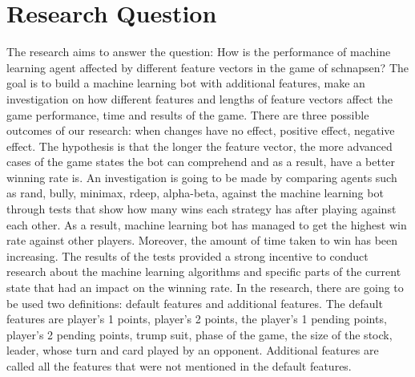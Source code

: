 \documentclass[master]{subfiles}
\begin{document}
\section{Research Question}
The research aims to answer the question: How is the performance of machine learning agent affected by different feature vectors in the game of schnapsen? The goal is to build a machine learning bot with additional features, make an investigation on how different features and lengths of feature vectors affect the game performance, time and results of the game. There are three possible outcomes of our research: when changes have no effect, positive effect, negative effect. The hypothesis is that the longer the feature vector, the more advanced cases of the game states the bot can comprehend and as a result, have a better winning rate is. An investigation is going to be made by comparing agents such as rand, bully, minimax, rdeep, alpha-beta, against the machine learning bot through tests that show how many wins each strategy has after playing against each other. As a result, machine learning bot has managed to get the highest win rate against other players. Moreover, the amount of time taken to win has been increasing. The results of the tests provided a strong incentive to conduct research about the machine learning algorithms and specific parts of the current state that had an impact on the winning rate. In the research, there are going to be used two definitions: default features and additional features. The default features are player’s 1 points, player’s 2 points, the player’s 1 pending points, player’s 2 pending points, trump suit, phase of the game, the size of the stock, leader, whose turn and card played by an opponent. Additional features are called all the features that were not mentioned in the default features.
\end{document}
